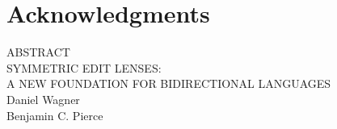 \documentclass[12pt]{report}
\numberwithin{equation}{section}
\def\thetitle{\uppercase{Symmetric Edit Lenses:\\A New Foundation For Bidirectional Languages}}
\def\theauthor{Daniel Wagner}
\def\theadvisor{Benjamin C. Pierce}
\begin{document}
\chapter*{Acknowledgments}

\newpage
\vspace*{\fill}

\begin{center}
  ABSTRACT\\
\vspace{.5in}
\thetitle\\
\vspace{.5in}
  \theauthor\\
  \theadvisor
\end{center}

\doublespacing
\noindent
\end{document}
